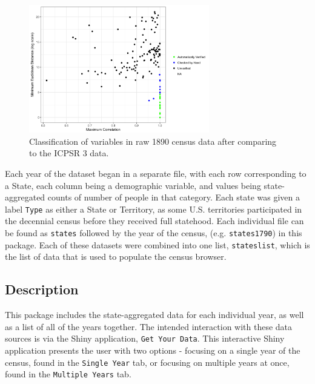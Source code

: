 \documentclass[11pt,]{article}
\begin{document}
\begin{figure}[htbp]
\centering
\includegraphics[width=0.70000\textwidth]{./figures/verification.png}
\caption{Classification of variables in raw 1890 census data after
comparing to the ICPSR 3 data.}
\end{figure}

Each year of the dataset began in a separate file, with each row
corresponding to a State, each column being a demographic variable, and
values being state-aggregated counts of number of people in that
category. Each state was given a label \texttt{Type} as either a State
or Territory, as some U.S. territories participated in the decennial
census before they received full statehood. Each individual file can be
found as \texttt{states} followed by the year of the census, (e.g.
\texttt{states1790}) in this package. Each of these datasets were
combined into one list, \texttt{stateslist}, which is the list of data
that is used to populate the census browser.

\subsection{Description}

This package includes the state-aggregated data for each individual
year, as well as a list of all of the years together. The intended
interaction with these data sources is via the Shiny application,
\texttt{Get\ Your\ Data}. This interactive Shiny application presents
the user with two options - focusing on a single year of the census,
found in the \texttt{Single\ Year} tab, or focusing on multiple years at
once, found in the \texttt{Multiple\ Years} tab.
\end{document}
